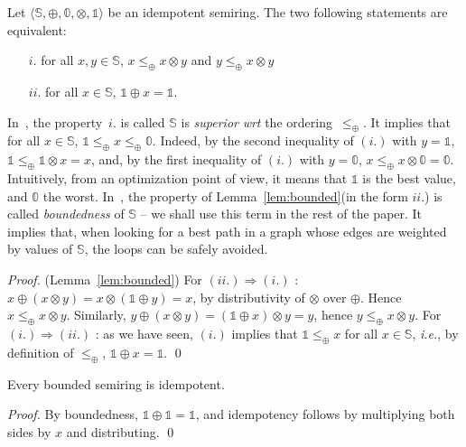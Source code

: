 \documentclass[runningheads]{llncs}
\def\ie{\textit{i.e.}\xspace}
\def\wrt{\textit{wrt}\xspace}
\def\<#1>{\langle #1 \rangle}
\newcommand{\Semiring}{\mathbb{S}}
\newcommand{\zero}{\mathbb{0}}
\newcommand{\one}{\mathbb{1}}
\newcommand{\dom}{\ensuremath{\mathit{dom}}}
\begin{document}
\begin{lemma}
\label{lem:superior}\label{lem:bounded}
Let $\< \Semiring, \oplus, \zero, \otimes, \one>$ be an idempotent semiring.
The two following statements are equivalent:
\begin{itemize}
\item [$i.$] for all $x, y \in \Semiring$,  
$x \leq_\oplus x \otimes y$ and 
$y \leq_\oplus x \otimes y$
\item[$ii.$] for all $x \in \Semiring$,  $\one \oplus x = \one$.
\end{itemize}
\end{lemma}
%
In~\cite{Huang08advanceddynamic}, the property~$i.$ is called 
$\Semiring$ is \emph{superior} \wrt the ordering~$\leq_\oplus$.
It implies that 
for all $x \in \Semiring$, $\one \leq_\oplus x \leq_\oplus \zero$.
Indeed, by the second inequality of $(i.)$ with $y = \one$, $\one \leq_\oplus \one \otimes x = x$, 
and, by the first inequality of $(i.)$ with $y = \zero$,  
$x \leq_\oplus x \otimes \zero = \zero$.
%
Intuitively, from an optimization point of view,
it means that $\one$ is the best value, and $\zero$ the worst.
%
In~\cite{Mohri02semiring}, the property of Lemma~\ref{lem:bounded}(in the form $ii.$) 
is called \emph{boundedness} of $\Semiring$ -- we shall use this term in the rest of the paper. 
It implies that, when looking for a best path in a graph whose edges
are weighted by values of $\Semiring$, the loops can be safely avoided.

\begin{proof}(Lemma~\ref{lem:bounded})
For $(ii.) \Rightarrow (i.)$ : 
$x \oplus (x \otimes y) = x \otimes (\one \oplus y) = x$, 
by distributivity of $\otimes$ over $\oplus$. 
Hence $x \leq_\oplus x \otimes y$.
Similarly, $y \oplus (x \otimes y) = (\one \oplus x) \otimes y = y$, 
hence $y \leq_\oplus x \otimes y$.
%
For $(i.) \Rightarrow (ii.)$ : as we have seen, $(i.)$ implies that 
$\one \leq_\oplus x$ for all $x \in \Semiring$, 
\ie, by definition of $\leq_\oplus$, $\one \oplus x = \one$.
\qed
\end{proof}


\begin{lemma}
Every bounded semiring is idempotent.
\end{lemma}
\begin{proof}
By boundedness, $\one \oplus \one = \one$, 
and idempotency follows by multiplying
both sides by $x$ and distributing. 
\qed
\end{proof}
\end{document}
